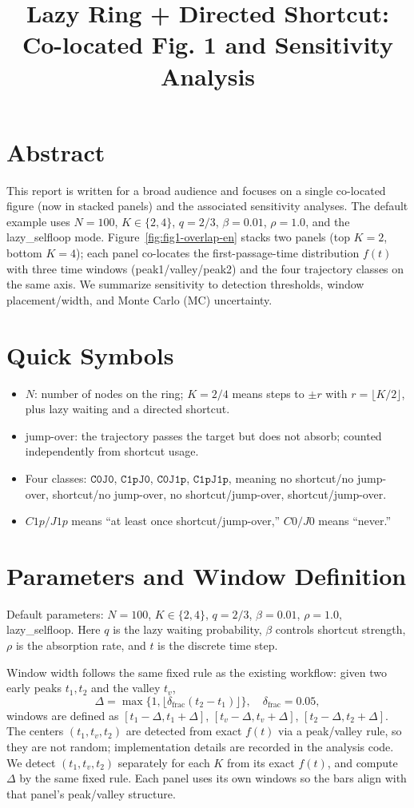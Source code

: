 \documentclass[11pt]{article}
\title{Lazy Ring + Directed Shortcut: Co-located Fig. 1 and Sensitivity Analysis}
\author{}
\date{}
\begin{document}
\maketitle

\section*{Abstract}
This report is written for a broad audience and focuses on a single co-located figure (now in stacked panels) and the associated sensitivity analyses.
The default example uses $N=100$, $K\in\{2,4\}$, $q=2/3$, $\beta=0.01$, $\rho=1.0$, and the lazy\_selfloop mode.
Figure~\ref{fig:fig1-overlap-en} stacks two panels (top $K=2$, bottom $K=4$); each panel co-locates the first-passage-time
distribution $f(t)$ with three time windows (peak1/valley/peak2) and the four trajectory classes on the same axis.
We summarize sensitivity to detection thresholds, window placement/width, and Monte Carlo (MC) uncertainty.

\section*{Quick Symbols}
\begin{itemize}
  \item $N$: number of nodes on the ring; $K=2/4$ means steps to $\pm r$ with $r=\lfloor K/2 \rfloor$, plus lazy waiting and a directed shortcut.
  \item jump-over: the trajectory passes the target but does not absorb; counted independently from shortcut usage.
  \item Four classes: $\texttt{C0J0}$, $\texttt{C1pJ0}$, $\texttt{C0J1p}$, $\texttt{C1pJ1p}$, meaning
        no shortcut/no jump-over, shortcut/no jump-over, no shortcut/jump-over, shortcut/jump-over.
  \item $C1p/J1p$ means ``at least once shortcut/jump-over,'' $C0/J0$ means ``never.''
\end{itemize}

\section*{Parameters and Window Definition}
Default parameters: $N=100$, $K\in\{2,4\}$, $q=2/3$, $\beta=0.01$, $\rho=1.0$, lazy\_selfloop.
Here $q$ is the lazy waiting probability, $\beta$ controls shortcut strength, $\rho$ is the absorption rate,
and $t$ is the discrete time step.

Window width follows the same fixed rule as the existing workflow: given two early peaks $t_1,t_2$ and the valley $t_v$,
\[
\Delta=\max\{1,\lfloor \delta_{\text{frac}}(t_2-t_1)\rfloor\},\quad \delta_{\text{frac}}=0.05,
\]
windows are defined as
$[t_1-\Delta,t_1+\Delta]$, $[t_v-\Delta,t_v+\Delta]$, $[t_2-\Delta,t_2+\Delta]$.
The centers $(t_1,t_v,t_2)$ are detected from exact $f(t)$ via a peak/valley rule,
so they are not random; implementation details are recorded in the analysis code.
We detect $(t_1,t_v,t_2)$ separately for each $K$ from its exact $f(t)$, and compute $\Delta$ by the same fixed rule.
Each panel uses its own windows so the bars align with that panel's peak/valley structure.
\end{document}
